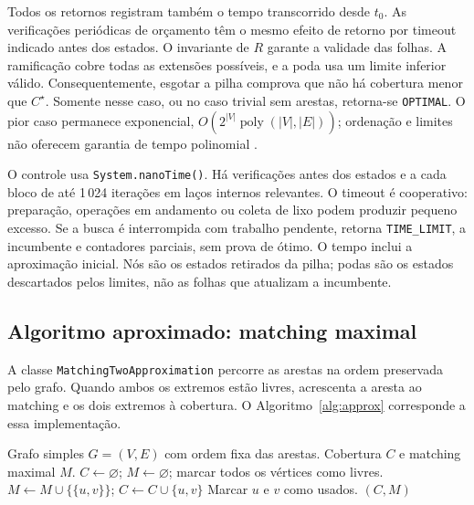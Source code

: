 Todos os retornos registram também o tempo transcorrido desde $t_0$.
As verificações periódicas de orçamento têm o mesmo efeito de
retorno por timeout indicado antes dos estados.
O invariante de $R$ garante a validade das folhas. A ramificação cobre
todas as extensões possíveis, e a poda usa um limite inferior válido.
Consequentemente, esgotar a pilha comprova que não há cobertura menor
que $C^\star$. Somente nesse caso, ou no caso trivial sem arestas,
retorna-se \texttt{OPTIMAL}. O pior caso permanece exponencial,
$O(2^{|V|}\operatorname{poly}(|V|,|E|))$; ordenação e limites não
oferecem garantia de tempo polinomial \cite{fomin2010}.

O controle usa \texttt{System.nanoTime()}. Há verificações antes dos
estados e a cada bloco de até 1\,024 iterações em laços internos
relevantes. O timeout é cooperativo: preparação, operações em
andamento ou coleta de lixo podem produzir pequeno excesso.
Se a busca é interrompida com trabalho pendente, retorna
\texttt{TIME\_LIMIT}, a incumbente e contadores parciais, sem prova
de ótimo. O tempo inclui a aproximação inicial. Nós são os estados
retirados da pilha; podas são os estados descartados pelos limites,
não as folhas que atualizam a incumbente.

\subsection{Algoritmo aproximado: matching maximal}
\label{sec:approx}

A classe \texttt{MatchingTwoApproximation} percorre as arestas na ordem
preservada pelo grafo. Quando ambos os extremos estão livres,
acrescenta a aresta ao matching e os dois extremos à cobertura.
O Algoritmo~\ref{alg:approx} corresponde a essa implementação.

\begin{algorithm}[htbp]
\caption{Aproximação por emparelhamento maximal}
\label{alg:approx}
\small
\begin{algorithmic}[1]
\Require Grafo simples $G=(V,E)$ com ordem fixa das arestas.
\Ensure Cobertura $C$ e matching maximal $M$.
\State $C\gets\varnothing$; $M\gets\varnothing$; marcar todos os vértices como livres.
    \State $M\gets M\cup\{\{u,v\}\}$; $C\gets C\cup\{u,v\}$
    \State Marcar $u$ e $v$ como usados.
  \EndIf
\EndFor
\State \Return $(C,M)$
\end{algorithmic}
\end{algorithm}

